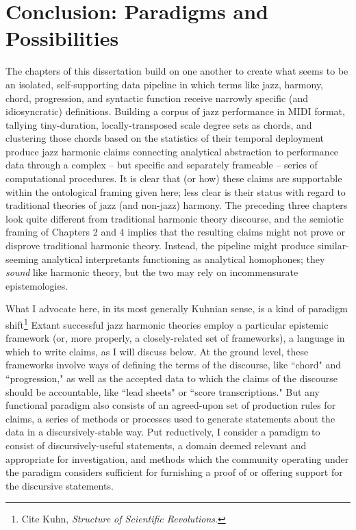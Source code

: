 \chapter{Conclusion: Paradigms and Possibilities}
The chapters of this dissertation build on one another to create what seems to be an isolated, self-supporting data pipeline in which terms like jazz, harmony, chord, progression, and syntactic function receive narrowly specific (and idiosyncratic) definitions.  Building a corpus of jazz performance in MIDI format, tallying tiny-duration, locally-transposed scale degree sets as chords, and clustering those chords based on the statistics of their temporal deployment produce jazz harmonic claims connecting analytical abstraction to performance data through a complex -- but specific and separately frameable -- series of computational procedures.  It is clear that (or how) these claims are supportable within the ontological framing given here; less clear is their status with regard to traditional theories of jazz (and non-jazz) harmony.  The preceding three chapters look quite different from traditional harmonic theory discourse, and the semiotic framing of Chapters 2 and 4 implies that the resulting claims might not prove or disprove traditional harmonic theory.  Instead, the pipeline might produce similar-seeming analytical interpretants functioning as analytical homophones; they \emph{sound} like harmonic theory, but the two may rely on incommensurate epistemologies.

What I advocate here, in its most generally Kuhnian sense, is a kind of paradigm shift\footnote{Cite Kuhn, \emph{Structure of Scientific Revolutions}.}  Extant successful jazz harmonic theories employ a particular epistemic framework (or, more properly, a closely-related set of frameworks), a language in which to write claims, as I will discuss below.  At the ground level, these frameworks involve ways of defining the terms of the discourse, like ``chord" and ``progression," as well as the accepted data to which the claims of the discourse should be accountable, like ``lead sheets" or ``score transcriptions."  But any functional paradigm also consists of an agreed-upon set of production rules for claims, a series of methods or processes used to generate statements about the data in a discursively-stable way.  Put reductively, I consider a paradigm to consist of discursively-useful statements, a domain deemed relevant and appropriate for investigation, and methods which the community operating under the paradigm considers sufficient for furnishing a proof of or offering support for the discursive statements.

